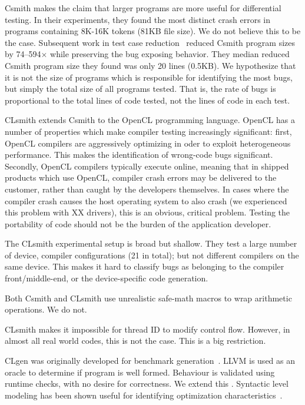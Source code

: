 Csmith makes the claim that larger programs are more useful for differential testing. In their experiments, they found the most distinct crash errors in programs containing 8K-16K tokens (81KB file size). We do not believe this to be the case. Subsequent work in test case reduction~\cite{Regehr2012a} reduced Csmith program sizes by 74--594$\times$ while preserving the bug exposing behavior. They median reduced Csmith program size they found was only 20 lines (0.5KB). We hypothesize that it is not the size of programs which is responsible for identifying the most bugs, but simply the total size of all programs tested. That is, the rate of bugs is proportional to the total lines of code tested, not the lines of code in each test.

CLsmith extends Csmith to the OpenCL programming language. OpenCL has a number of properties which make compiler testing increasingly significant: first, OpenCL compilers are aggressively optimizing in oder to exploit heterogeneous performance. This makes the identification of wrong-code bugs significant. Secondly, OpenCL compilers typically execute online, meaning that in shipped products which use OpenCL, compiler crash errors may be delivered to the customer, rather than caught by the developers themselves. In cases where the compiler crash causes the host operating system to also crash (we experienced this problem with XX drivers), this is an obvious, critical problem. Testing the portability of code should not be the burden of the application developer.

The CLsmith experimental setup is broad but shallow. They test a large number of device, compiler configurations (21 in total); but not different compilers on the same device. This makes it hard to classify bugs as belonging to the compiler front/middle-end, or the device-specific code generation.

Both Csmith and CLsmith use unrealistic safe-math macros to wrap arithmetic operations. We do not.

CLsmith makes it impossible for thread ID to modify control flow. However, in almost all real world codes, this is not the case. This is a big restriction.

CLgen was originally developed for benchmark generation~\cite{Cummins2017a}. LLVM is used as an oracle to determine if program is well formed. Behaviour is validated using runtime checks, with no desire for correctness. We extend this \cc{\ldots}. Syntactic level modeling has been shown useful for identifying optimization characteristics~\cite{Cummins2017b}.

